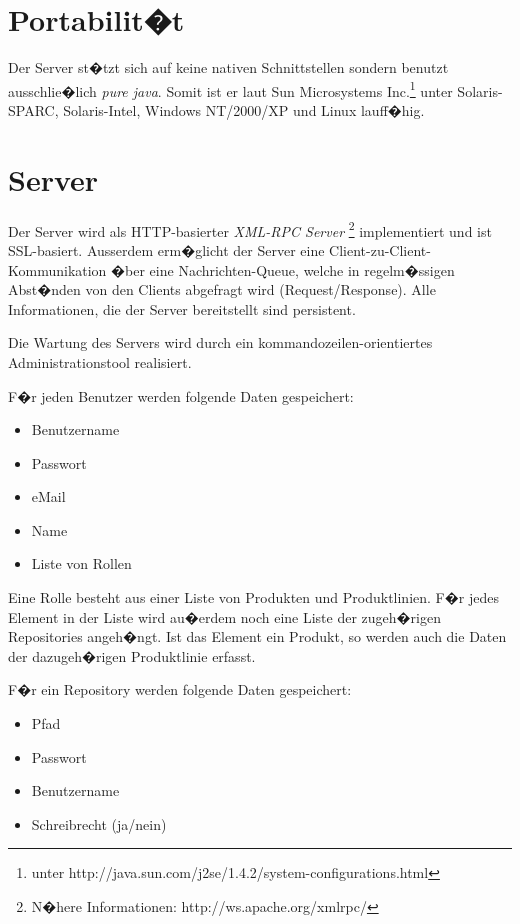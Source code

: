 \section{Portabilit�t}
Der Server st�tzt sich auf keine nativen Schnittstellen sondern benutzt ausschlie�lich 
\emph{pure java}. Somit ist er laut Sun Microsystems 
Inc.\footnote{unter http://java.sun.com/j2se/1.4.2/system-configurations.html} unter 
Solaris-SPARC, Solaris-Intel, Windows NT/2000/XP und Linux lauff�hig.


\section{Server}
Der Server wird als HTTP-basierter {\it XML-RPC Server}
\footnote{N�here Informationen: http://ws.apache.org/xmlrpc/}
implementiert und ist SSL-basiert. Ausserdem erm�glicht
der Server eine Client-zu-Client-Kommunikation �ber eine Nachrichten-Queue, welche
in regelm�ssigen Abst�nden von den Clients abgefragt wird (Request/Response).
Alle Informationen, die der Server bereitstellt sind persistent.\par
Die Wartung des Servers wird durch ein kommandozeilen-orientiertes
Administrationstool realisiert.\newline

F�r jeden Benutzer werden folgende Daten gespeichert:
\begin{itemize}
\item Benutzername
\item Passwort
\item eMail
\item Name
\item Liste von Rollen
\end{itemize}

Eine Rolle besteht aus einer Liste von Produkten und Produktlinien.\newline
F�r jedes Element in der Liste wird au�erdem noch eine Liste der zugeh�rigen Repositories angeh�ngt. 
Ist das Element ein Produkt, so werden auch die Daten der dazugeh�rigen Produktlinie erfasst.\newline

F�r ein Repository werden folgende Daten gespeichert:
\begin{itemize}
\item Pfad
\item Passwort
\item Benutzername
\item Schreibrecht (ja/nein)
\end{itemize}

